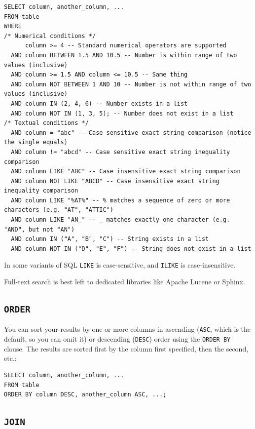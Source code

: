 \documentclass[table, xcdraw]{article}%
\begin{document}
\begin{verbatim}
SELECT column, another_column, ...
FROM table
WHERE
/* Numerical conditions */
      column >= 4 -- Standard numerical operators are supported
  AND column BETWEEN 1.5 AND 10.5 -- Number is within range of two values (inclusive)
  AND column >= 1.5 AND column <= 10.5 -- Same thing
  AND column NOT BETWEEN 1 AND 10 -- Number is not within range of two values (inclusive)
  AND column IN (2, 4, 6) -- Number exists in a list
  AND column NOT IN (1, 3, 5); -- Number does not exist in a list
/* Textual conditions */
  AND column = "abc" -- Case sensitive exact string comparison (notice the single equals)
  AND column != "abcd" -- Case sensitive exact string inequality comparison
  AND column LIKE "ABC" -- Case insensitive exact string comparison
  AND column NOT LIKE "ABCD" -- Case insensitive exact string inequality comparison
  AND column LIKE "%AT%" -- % matches a sequence of zero or more characters (e.g. "AT", "ATTIC")
  AND column LIKE "AN_" -- _ matches exactly one character (e.g. "AND", but not "AN")
  AND column IN ("A", "B", "C") -- String exists in a list
  AND column NOT IN ("D", "E", "F") -- String does not exist in a list
\end{verbatim}

In some variants of SQL \texttt{LIKE} is case-sensitive, and \texttt{ILIKE} is case-insensitive.

Full-text search is best left to dedicated libraries like Apache Lucene or Sphinx.

\subsection{\texttt{ORDER}}

You can sort your results by one or more columns in ascending (\texttt{ASC}, which is the default, so you can omit it) or descending (\texttt{DESC}) order using the \texttt{ORDER BY} clause. The results are sorted first by the column first specified, then the second, etc.:

\begin{verbatim}
SELECT column, another_column, ...
FROM table
ORDER BY column DESC, another_column ASC, ...;
\end{verbatim}

\subsection{\texttt{JOIN}}
\end{document}
